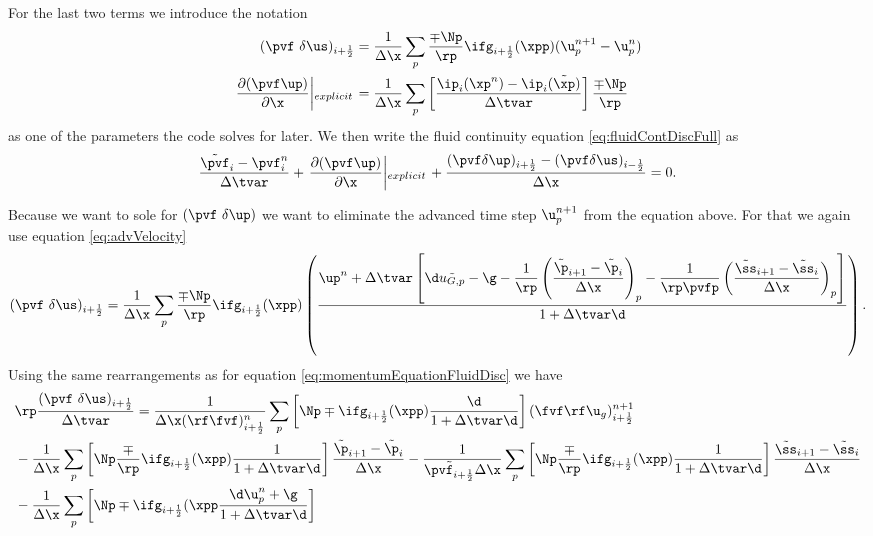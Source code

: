 For the last two terms we introduce the notation
\begin{align*}
    ( \pvf \ \delta \us )_{i+\frac{1}{2}} &= \dfrac{1}{\Delta \x} \sum_p \dfrac{\mp \Np}{\rp} \ifg_{i+\frac{1}{2}} (\xpp) (\u_p^{n+1} - \u_p^n) \\ \left. \dfrac{\partial (\pvf \up)}{\partial \x} \middle|_{explicit} \right. &= \dfrac{1}{\Delta \x} \sum_p \left[ \dfrac{\ip_i (\xp^n) - \ip_i (\tilde{\xp})}{\Delta \tvar}\right] \dfrac{\mp \Np}{\rp}
\end{align*}
as one of the parameters the code solves for later.
We then write the fluid continuity equation \eqref{eq:fluidContDiscFull} as
\begin{equation}
    \label{eq:fluidContDisc}
    \dfrac{\tilde{\pvf}_i - \pvf_i^n}{\Delta \tvar} + \left. \dfrac{\partial (\pvf \up)}{\partial \x} \middle|_{explicit} \right. + \dfrac{(\pvf \delta \up)_{i+\frac{1}{2}} - (\pvf \delta \us)_{i-\frac{1}{2}}}{\Delta \x} = 0.
\end{equation}

Because we want to sole for $(\pvf \ \delta \up)$ we want to eliminate the advanced time step $\u_p^{n+1}$ from the equation above. For that we again use equation \eqref{eq:advVelocity}
\begin{align*}
    (\pvf \ \delta \us )_{i+\frac{1}{2}} = \dfrac{1}{\Delta \x} \sum_p \dfrac{\mp \Np}{\rp} \ifg_{i+\frac{1}{2}} (\xpp) \left( \dfrac{\up^n + \Delta \tvar \left[\d \tilde{u_{G,p}} - \g - \dfrac{1}{\rp} \left(\dfrac{\tilde{\p}_{i+1} - \tilde{\p}_i}{\Delta \x} \right)_p - \dfrac{1}{\rp \pvfp} \left( \dfrac{\tilde{\ss}_{i+1} - \tilde{\ss}_i}{\Delta \x}\right)_p \right]}{1 + \Delta \tvar \d} \right).
\end{align*}
Using the same rearrangements as for equation \eqref{eq:momentumEquationFluidDisc} we have
\begin{equation}
\label{eq:momentumGasDisc}
\begin{aligned}
    &\rp \dfrac{ (\pvf \ \delta \us )_{i+\frac{1}{2}}}{\Delta \tvar} = \dfrac{1}{\Delta \x (\rf \fvf)_{i+\frac{1}{2}}^n} \sum_p \left[ \Np \mp \ifg_{i+\frac{1}{2}} (\xpp) \dfrac{\d}{1+\Delta \tvar \d} \right] (\fvf \rf \u_g)_{i+\frac{1}{2}}^{n+1} \\
    &- \dfrac{1}{\Delta \x} \sum_p \left[ \Np \dfrac{\mp}{\rp} \ifg_{i+\frac{1}{2}} (\xpp) \dfrac{1}{1+\Delta \tvar \d}\right] \dfrac{\tilde{\p}_{i+1} - \tilde{\p}_i}{\Delta \x} - \dfrac{1}{\tilde{\pvf_{i+\frac{1}{2}}} \Delta \x} \sum_p \left[ \Np \dfrac{\mp}{\rp} \ifg_{i+\frac{1}{2}} (\xpp) \dfrac{1}{1+\Delta \tvar \d} \right]
    \dfrac{\tilde{\ss}_{i+1}- \tilde{\ss}_i}{\Delta \x} \\
    &- \dfrac{1}{\Delta \x} \sum_p \left[ \Np \mp \ifg_{i+\frac{1}{2}} (\xpp \dfrac{\d \u_p^n + \g}{1 + \Delta \tvar \d}\right]
\end{aligned}
\end{equation}

